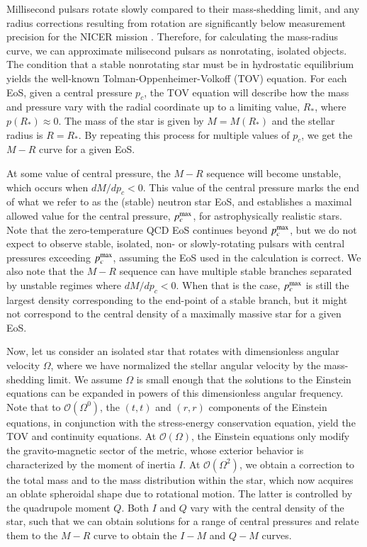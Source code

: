 \documentclass[aps,prd,nofootinbib,tightenlines,notitlepage,floatfix,superscriptaddress,showkeys,twocolumn]{revtex4-1}
\begin{document}
Millisecond pulsars rotate slowly compared to their mass-shedding limit, and any radius corrections resulting from rotation are significantly below measurement precision for the NICER mission \cite{Miller:2021qha}. Therefore, for calculating the mass-radius curve, we can approximate milisecond pulsars as nonrotating, isolated objects. The condition that a stable nonrotating star must be in hydrostatic equilibrium yields the well-known Tolman-Oppenheimer-Volkoff (TOV) equation. For each EoS, given a central pressure $p_c$, the TOV equation will describe how the mass and pressure vary with the radial coordinate up to a limiting value, $R_*$, where $p(R_*) \approx 0$. The mass of the star is given by $M=M(R_*)$ and the stellar radius is $R = R_*$. By repeating this process for multiple values of $p_c$, we get the $M-R$ curve for a given EoS. 

At some value of central pressure, the $M-R$ sequence will become unstable, which occurs when $dM/dp_c<0$. This value of the central pressure marks the end of what we refer to as the (stable) neutron star EoS, and establishes a maximal allowed value for the central pressure, $p^{\rm max}_c$, for astrophysically realistic stars. Note that the zero-temperature QCD EoS continues beyond $p^{\rm max}_c$, but we do not expect to observe stable, isolated, non- or slowly-rotating pulsars with central pressures exceeding $p^{\rm max}_c$, assuming the EoS used in the calculation is correct. We also note that the $M-R$ sequence can have multiple stable branches separated by unstable regimes where $dM/dp_c<0$. When that is the case, $p^{\rm max}_c$ is still the largest density corresponding to the end-point of a stable branch, but it might not correspond to the central density of a maximally massive star for a given EoS.

Now, let us consider an isolated star that rotates with dimensionless angular velocity $\Omega$, where we have normalized the stellar angular velocity by the mass-shedding limit. We assume $\Omega$ is small enough that the solutions to the Einstein equations can be expanded in powers of this dimensionless angular frequency. 
Note that to $\mathcal{O}(\Omega^0)$, the $(t,t)$ and $(r,r)$ components of the Einstein equations, in conjunction with the stress-energy conservation equation, yield the TOV and continuity equations. At $\mathcal{O}(\Omega)$, the Einstein equations only modify the gravito-magnetic sector of the metric, whose exterior behavior is characterized by the moment of inertia $I$. At $\mathcal{O}(\Omega^2)$, we obtain a correction to the total mass and to the mass distribution within the star, which now acquires an oblate spheroidal shape due to rotational motion. The latter is controlled by the quadrupole moment $Q$. Both $I$ and $Q$ vary with the central density of the star, such that we can obtain solutions for a range of central pressures and relate them to the $M-R$ curve to obtain the $I-M$ and $Q-M$ curves.
\end{document}
